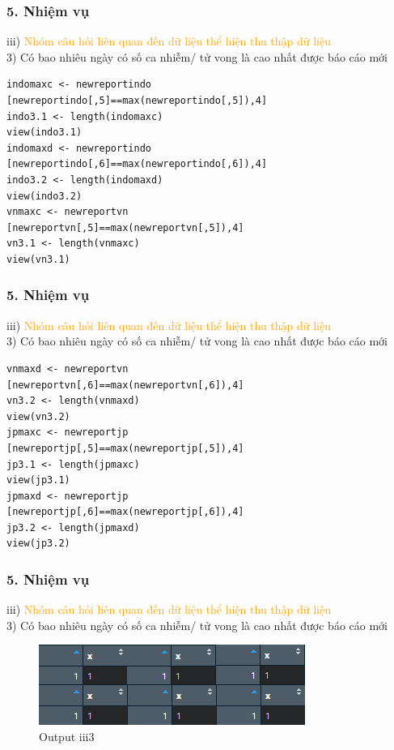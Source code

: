 \documentclass[english,10pt,table]{beamer}
\begin{document}
\begin{frame}[fragile]
\frametitle{5.  Nhiệm vụ}
	iii) \textcolor{orange}{Nhóm câu hỏi liên quan đến dữ liệu thể hiện thu thập dữ liệu}\\%
    3) Có bao nhiêu ngày có số ca nhiễm/ tử vong là cao nhất được báo cáo mới    \begin{lstlisting}[frame=single]  
indomaxc <- newreportindo
[newreportindo[,5]==max(newreportindo[,5]),4] 
indo3.1 <- length(indomaxc)
view(indo3.1)
indomaxd <- newreportindo
[newreportindo[,6]==max(newreportindo[,6]),4] 
indo3.2 <- length(indomaxd)
view(indo3.2)
vnmaxc <- newreportvn
[newreportvn[,5]==max(newreportvn[,5]),4] 
vn3.1 <- length(vnmaxc)
view(vn3.1)
	\end{lstlisting}
\end{frame}

\begin{frame}[fragile]
\frametitle{5.  Nhiệm vụ}
	iii) \textcolor{orange}{Nhóm câu hỏi liên quan đến dữ liệu thể hiện thu thập dữ liệu}\\%
    3) Có bao nhiêu ngày có số ca nhiễm/ tử vong là cao nhất được báo cáo mới    \begin{lstlisting}[frame=single]  
vnmaxd <- newreportvn
[newreportvn[,6]==max(newreportvn[,6]),4] 
vn3.2 <- length(vnmaxd)
view(vn3.2)
jpmaxc <- newreportjp
[newreportjp[,5]==max(newreportjp[,5]),4] 
jp3.1 <- length(jpmaxc)
view(jp3.1)
jpmaxd <- newreportjp
[newreportjp[,6]==max(newreportjp[,6]),4] 
jp3.2 <- length(jpmaxd)
view(jp3.2)
	\end{lstlisting}
\end{frame}

\begin{frame}[fragile]
\frametitle{5.  Nhiệm vụ}
	iii) \textcolor{orange}{Nhóm câu hỏi liên quan đến dữ liệu thể hiện thu thập dữ liệu}\\%
    3) Có bao nhiêu ngày có số ca nhiễm/ tử vong là cao nhất được báo cáo mới 	\begin{figure}[h!]
	\begin{center}
		    \includegraphics[scale = 1]{Images/III/iii3.png}
		     \caption{Output iii3}
		\end{center}
		\end{figure}
\end{frame}
\end{document}
